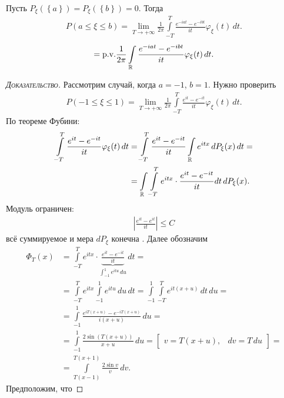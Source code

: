 \documentclass[../main.tex]{subfiles}
\begin{document}
\begin{thm}
 Пусть $ P_\xi(\left\{ a \right\}) = P_\xi(\left\{ b \right\}) = 0 $. Тогда
 \begin{align*}
  P(a \leqslant \xi \leqslant b) = \lim_{T \to +\infty} \frac{1}{2\pi} \int\limits_{-T}^{T}  \frac{e^{-iat}-e^{-ibt}}{it} \varphi_\xi(t)\,dt.
 \end{align*}
 \begin{align*}
  = \mathrm{p.v.} \frac{1}{2\pi} \int\limits_{\mathbb{R}} \frac{e^{-iat}-e^{-ibt}}{it} \varphi_\xi(t)\,dt.
 \end{align*}
\end{thm}
\begin{proof}[\normalfont\textsc{Доказательство}]
 Рассмотрим случай, когда $ a = -1 $, $ b = 1 $. Нужно проверить
 \begin{align*}
  P(-1 \leqslant \xi \leqslant 1) = \lim_{T \to +\infty} \frac{1}{2\pi}\int\limits_{-T}^{T} \frac{e^{it}-e^{-it}}{it}\varphi_\xi(t)\,dt.
 \end{align*}
 По теореме Фубини:
 \begin{align*}
  \int\limits_{-T}^{T} \frac{e^{it}-e^{-it}}{it}\varphi_\xi(t)\,dt &= \int\limits_{-T}^{T} \frac{e^{it}-e^{-it}}{it} \int\limits_{\mathbb{R}} e^{itx}\,dP_\xi(x)\,dt = \\
  &= \int\limits_{\mathbb{R}} \int\limits_{-T}^{T} e^{itx} \cdot \frac{e^{it}-e^{-it}}{it}dt\,dP_\xi(x). 
 \end{align*} Модуль ограничен:
 \begin{align*}
  \left| \frac{e^{it}-e^{it}}{it} \right| \leqslant C
 \end{align*} всё суммируемое и мера $dP_\xi$ конечна . Далее обозначим
 \begin{align*}
  \Phi_T(x) &= \int\limits_{-T}^{T} e^{itx} \cdot \underbrace{\frac{e^{it}-e^{-it}}{it}}_{\int_{-1}^{1} e^{itu}\,du}\,dt = \\
  &= \int\limits_{-T}^{T} e^{itx}\int\limits_{-1}^{1} e^{itu}\,du\,dt = \int\limits_{-1}^{1} \int\limits_{-T}^{T} e^{it(x+u)}\,dt\,du = \\
  &= \int\limits_{-1}^{1} \frac{e^{iT(x+u)} - e^{-iT(x+u)}}{i(x+u)}\,du = \\
  &= \int\limits_{-1}^{1} \frac{2\sin(T(x+u))}{x+u}\,du = \begin{bmatrix}
   v = T(x+u), & dv = T\,du
  \end{bmatrix} = \\
  &= \int\limits_{T(x-1)}^{T(x+1)} \frac{2\sin v}{v}\,dv.
 \end{align*} Предположим, что

\end{proof}
\end{document}

